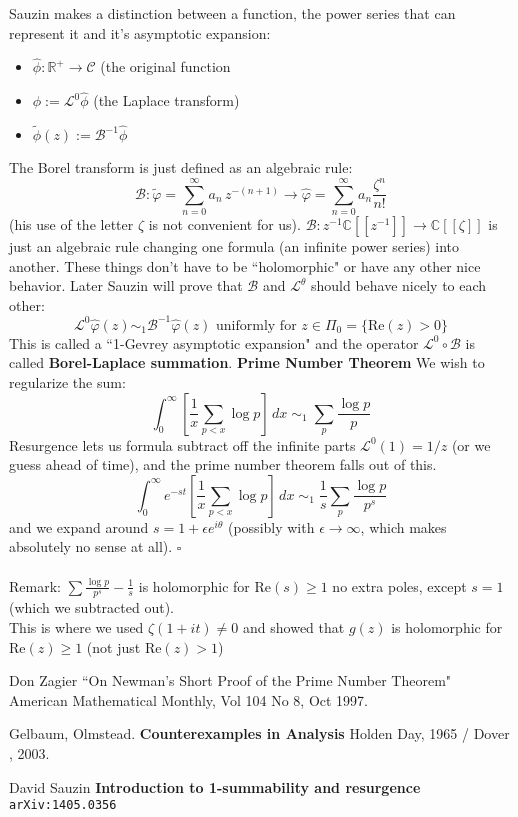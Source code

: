 \documentclass[12pt]{article}
\begin{document}
\newpage

\noindent Sauzin makes a distinction between a function, the power series that can represent it and it's asymptotic expansion:
\begin{itemize}
\item $\hat{\phi}:\mathbb{R}^+ \to \mathcal{C} $ (the original function
\item $\phi := \mathcal{L}^0 \hat{\phi}$ (the Laplace transform)
\item $\tilde{\phi}(z) := \mathcal{B}^{-1}\hat{\phi}$
\end{itemize}
The Borel transform is just defined as an algebraic rule:
$$
\mathcal{B}: \tilde{\varphi} = \sum_{n=0}^\infty 
a_n \, z^{-(n+1)} \to \hat{\varphi} = \sum_{n=0}^\infty a_n \frac{\zeta^n}{n!}
 $$
(his use of the letter $\zeta$ is not convenient for us). $\mathcal{B}: z^{-1} \mathbb{C}[[z^{-1}]] \to \mathbb{C}[[\zeta]]$ is just an algebraic rule changing one formula (an infinite power series) into another.  These things don't have to be ``holomorphic" or have any other nice behavior.  Later Sauzin will prove that $\mathcal{B}$ and $\mathcal{L}^\theta$ should behave nicely to each other:
$$ \mathcal{L}^0 \hat{\varphi}(z)\sim_1 \mathcal{B}^{-1}\hat{\varphi}(z) \text{ uniformly for }z \in \Pi_0 = \{ \mathrm{Re}(z) > 0 \} $$
This is called a ``1-Gevrey asymptotic expansion" and the operator $\mathcal{L}^0 \circ \mathcal{B}$ is called \textbf{Borel-Laplace summation}. \vfill
\noindent \textbf{\color{green!50!orange}Prime Number Theorem} We wish to regularize the sum:
$$ \int_0^\infty \left[ \frac{1}{x}\sum_{p < x} \log p \right] \, dx \; \sim_1 \; \sum_p \frac{\log p}{p} $$
Resurgence lets us formula subtract off the infinite parts $\mathcal{L}^0(1) = 1/z$ (or we guess ahead of time), and the prime number theorem falls out of this.
$$ \int_0^\infty e^{-st} \left[ \frac{1}{x}\sum_{p < x} \log p \right] \, dx \; \sim_1 \; \frac{1}{s}\sum_p \frac{\log p}{p^s} $$
and we expand around $s = 1 + \epsilon e^{i\theta}$ (possibly with $\epsilon \to \infty$, which makes absolutely no sense at all). \hfill $\square$ \\ \\
Remark: $ \sum \frac{\log p}{p^s} - \frac{1}{s} $ is holomorphic for $\mathrm{Re}(s)\geq 1$ no extra poles, except $s=1$ (which we subtracted out). \\ 
This is where we used $\zeta(1 + it) \neq 0$ and showed that $g(z)$ is holomorphic for $\mathrm{Re}(z) \geq 1$ (not just $\mathrm{Re}(z) > 1$)

\vfill

\begin{thebibliography}{}

\item Don Zagier ``On Newman's Short Proof of the Prime Number Theorem" American Mathematical Monthly, Vol 104 No 8, Oct 1997.

\item Gelbaum, Olmstead. \textbf{Counterexamples in Analysis} Holden Day, 1965 / Dover , 2003.

\item David Sauzin \textbf{Introduction to 1-summability and resurgence} \texttt{arXiv:1405.0356}

\end{thebibliography}
\end{document}
